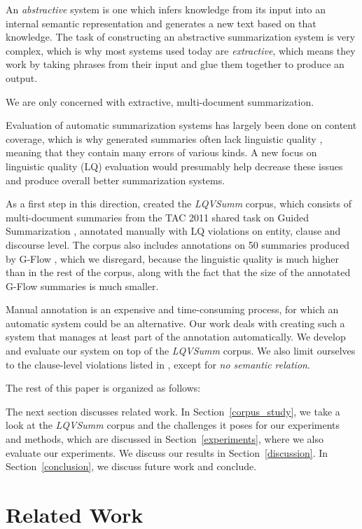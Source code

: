 \documentclass[a4paper,10pt]{scrartcl}
\theoremstyle{style}
\begin{document}
An \textit{abstractive} system is one which infers knowledge from its input into an internal semantic representation and generates a new text based on that knowledge. The task of constructing an abstractive summarization system is very complex, which is why most systems used today are \textit{extractive}, which means they work by taking phrases from their input and glue them together to produce an output.

We are only concerned with extractive, multi-document summarization.

Evaluation of automatic summarization systems has largely been done on content coverage, which is why generated summaries often lack linguistic quality \citep{nenkova2011foundations}, meaning that they contain many errors of various kinds. A new focus on linguistic quality (LQ) evaluation would presumably help decrease these issues and produce overall better summarization systems.

As a first step in this direction, \cite{friedrichlqvsumm} created the \textit{LQVSumm} corpus, which consists of multi-document summaries from the TAC 2011 shared task on Guided Summarization \citep{owczarzak2011overview}, annotated manually with LQ violations on entity, clause and discourse level. The corpus also includes annotations on 50 summaries produced by G-Flow \citep{gflow}, which we disregard, because the linguistic quality is much higher than in the rest of the corpus, along with the fact that the size of the annotated G-Flow summaries is much smaller.

Manual annotation is an expensive and time-consuming process, for which an automatic system could be an alternative. Our work deals with creating such a system that manages at least part of the annotation automatically. We develop and evaluate our system on top of the \textit{LQVSumm} corpus. We also limit ourselves to the clause-level violations listed in \cite{friedrichlqvsumm}, except for \textit{no semantic relation}.

The rest of this paper is organized as follows:

The next section discusses related work. In Section~\ref{corpus_study}, we take a look at the \textit{LQVSumm} corpus and the challenges it poses for our experiments and methods, which are discussed in Section~\ref{experiments}, where we also evaluate our experiments. We discuss our results in Section~\ref{discussion}. In Section~\ref{conclusion}, we discuss future work and conclude.

\section{Related Work}
\label{related_work}
\end{document}
